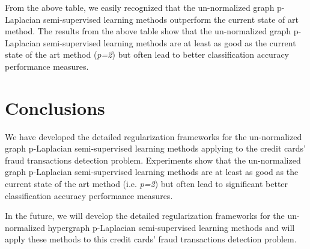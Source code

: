 

From the above table, we easily recognized that the un-normalized graph p-Laplacian semi-supervised learning methods outperform the current state of art method. The results from the above table show that the un-normalized graph p-Laplacian semi-supervised learning methods are at least as good as the current state of the art method (\textit{p=2}) but often lead to better classification accuracy performance measures.


\section{Conclusions}

We have developed the detailed regularization frameworks for the un-normalized graph p-Laplacian semi-supervised learning methods applying to the credit cards’ fraud transactions detection problem. Experiments show that the un-normalized graph p-Laplacian semi-supervised learning methods are at least as good as the current state of the art method (i.e. \textit{p=2}) but often lead to significant better classification accuracy performance measures. 

In the future, we will develop the detailed regularization frameworks for the un-normalized hypergraph p-Laplacian semi-supervised learning methods and will apply these methods to this credit cards’ fraud transactions detection problem.
